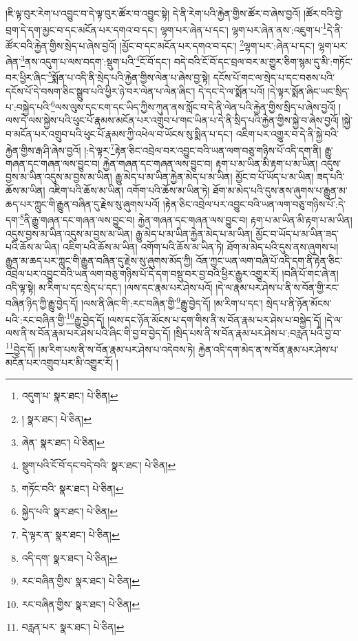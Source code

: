 །ཇི་ལྟ་བུར་རེག་པ་འབྱུང་བ་དེ་ལྟ་བུར་ཚོར་བ་འབྱུང་སྟེ། དེ་ནི་རེག་པའི་རྐྱེན་གྱིས་ཚོར་བ་ཞེས་བྱའོ། །ཚོར་བའི་བྱེ་བྲག་དེ་དག་མྱང་བ་དང་མངོན་པར་དགའ་བ་དང་། ལྷག་པར་ཞེན་པ་དང་། ལྷག་པར་ཞེན་ནས་:འཇུག་པ་\footnote{འདུག་པ་  སྣར་ཐང་།  པེ་ཅིན། }དེ་ནི་ཚོར་བའི་རྐྱེན་གྱིས་སྲེད་པ་ཞེས་བྱའོ། །མྱོང་བ་དང་མངོན་པར་དགའ་བ་དང་། \footnote{།    སྣར་ཐང་།  པེ་ཅིན། }ལྷག་པར་:ཞེན་པ་དང་། ལྷག་པར་ཞེན་\footnote{ཞེན་  སྣར་ཐང་།  པེ་ཅིན། }ནས་འདུག་པ་ལས་བདག་:སྡུག་པའི་\footnote{སྡུག་པའི་ངོ་བོ་དང་བདེ་བའི་  སྣར་ཐང་།  པེ་ཅིན། }ངོ་བོ་དང་། བདེ་བའི་ངོ་བོ་དང་བྲལ་བར་མ་གྱུར་ཅིག་སྙམ་དུ་མི་:གཏོང་བར་ཕྱིར་ཞིང་\footnote{གཏོང་བའི་  སྣར་ཐང་།  པེ་ཅིན། }སྨོན་པ་འདི་ནི་སྲེད་པའི་རྐྱེན་གྱིས་ལེན་པ་ཞེས་བྱ་སྟེ། དངོས་པོ་གང་ལ་སྲེད་པ་དང་བཅས་པའི་དངོས་པོ་དེ་བསག་ཅིང་སྒྲུབ་པའི་ཕྱིར་ཉེ་བར་ལེན་པ་ལེན་ཞིང་། དེ་དང་དེ་ལ་སྨོན་པའོ། །དེ་ལྟར་སྨོན་ཞིང་ཡང་སྲིད་པ་:བསྐྱེད་པའི་\footnote{སྐྱེད་པའི་  སྣར་ཐང་།  པེ་ཅིན། }ལས་ལུས་དང་ངག་དང་ཡིད་ཀྱིས་ཀུན་ནས་སློང་བ་དེ་ནི་ལེན་པའི་རྐྱེན་གྱིས་སྲིད་པ་ཞེས་བྱའོ། །ལས་དེ་ལས་སྐྱེས་པའི་ཕུང་པོ་རྣམས་མངོན་པར་འགྲུབ་པ་གང་ཡིན་པ་དེ་ནི་སྲིད་པའི་རྐྱེན་གྱིས་སྐྱེ་བ་ཞེས་བྱའོ། །སྐྱེ་བ་མངོན་པར་འགྲུབ་པའི་ཕུང་པོ་རྣམས་ཀྱི་འཕེལ་བ་ཡོངས་སུ་སྨིན་པ་དང་། འཇིག་པར་འགྱུར་བ་དེ་ནི་སྐྱེ་བའི་རྐྱེན་གྱིས་རྒ་ཤི་ཞེས་བྱའོ། །:དེ་ལྟར་\footnote{དེ་ལྟར་ན་  སྣར་ཐང་།  པེ་ཅིན། }རྟེན་ཅིང་འབྲེལ་བར་འབྱུང་བའི་ཡན་ལག་བཅུ་གཉིས་པོ་འདི་དག་ནི། རྒྱུ་གཞན་དང་གཞན་ལས་བྱུང་བ། རྐྱེན་གཞན་དང་གཞན་ལས་བྱུང་བ། རྟག་པ་མ་ཡིན་མི་རྟག་པ་མ་ཡིན། འདུས་བྱས་མ་ཡིན་འདུས་མ་བྱས་མ་ཡིན། རྒྱུ་མེད་པ་མ་ཡིན་རྐྱེན་མེད་པ་མ་ཡིན། མྱོང་བ་པོ་ཡོད་པ་མ་ཡིན། ཟད་པའི་ཆོས་མ་ཡིན། འཇིག་པའི་ཆོས་མ་ཡིན། འགོག་པའི་ཆོས་མ་ཡིན་ཏེ། ཐོག་མ་མེད་པའི་དུས་ནས་ཞུགས་པ་རྒྱུན་མ་ཆད་པར་ཀླུང་གི་རྒྱུན་བཞིན་དུ་རྗེས་སུ་ཞུགས་པའོ། །རྟེན་ཅིང་འབྲེལ་པར་འབྱུང་བའི་ཡན་ལག་བཅུ་གཉིས་པོ་:དེ་དག་\footnote{འདི་དག་  སྣར་ཐང་།  པེ་ཅིན། }ནི་རྒྱུ་གཞན་དང་གཞན་ལས་བྱུང་བ། རྐྱེན་གཞན་དང་གཞན་ལས་བྱུང་བ། རྟག་པ་མ་ཡིན་མི་རྟག་པ་མ་ཡིན། འདུས་བྱས་མ་ཡིན་འདུས་མ་བྱས་མ་ཡིན། རྒྱུ་མེད་པ་མ་ཡིན་རྐྱེན་མེད་པ་མ་ཡིན། མྱོང་བ་ཡོད་པ་མ་ཡིན་ཟད་པའི་ཆོས་མ་ཡིན། འཇིག་པའི་ཆོས་མ་ཡིན། འགོག་པའི་ཆོས་མ་ཡིན་ཏེ། ཐོག་མ་མེད་པའི་དུས་ནས་ཞུགས་པ། རྒྱུན་མ་ཆད་པར་ཀླུང་གི་རྒྱུན་བཞིན་དུ་རྗེས་སུ་ཞུགས་མོད་ཀྱི། འོན་ཀྱང་ཡན་ལག་བཞི་པོ་འདི་དག་ནི་རྟེན་ཅིང་འབྲེལ་པར་འབྱུང་བའི་ཡན་ལག་བཅུ་གཉིས་པོ་དེ་དག་བསྡུ་བར་བྱ་བའི་ཕྱིར་རྒྱུར་འགྱུར་རོ། །བཞི་པོ་གང་ཞེ་ན། འདི་ལྟ་སྟེ། མ་རིག་པ་དང་སྲེད་པ་དང་། །ལས་དང་རྣམ་པར་ཤེས་པའོ། །དེ་ལ་རྣམ་པར་ཤེས་པ་ནི་ས་བོན་གྱི་རང་བཞིན་ཉིད་ཀྱི་རྒྱུ་བྱེད་དོ། །ལས་ནི་ཞིང་གི་:རང་བཞིན་གྱི་\footnote{རང་བཞིན་གྱིས་  སྣར་ཐང་།  པེ་ཅིན། }རྒྱུ་བྱེད་དོ། །མ་རིག་པ་དང་། སྲེད་པ་ནི་ཉོན་མོངས་པའི་:རང་བཞིན་གྱི་\footnote{རང་བཞིན་གྱིས་  སྣར་ཐང་།  པེ་ཅིན། }རྒྱུ་བྱེད་དོ། །ལས་དང་ཉོན་མོངས་པ་དག་གིས་ནི་ས་བོན་རྣམ་པར་ཤེས་པ་བསྐྱེད་དོ། །དེ་ལ་ལས་ནི་ས་བོན་རྣམ་པར་ཤེས་པའི་ཞིང་གི་བྱ་བ་བྱེད་དོ། །སྲིད་པས་ནི་ས་བོན་རྣམ་པར་ཤེས་པ་:བརླན་པའི་བྱ་བ་\footnote{བརླན་པར་  སྣར་ཐང་།  པེ་ཅིན། }བྱེད་དོ། །མ་རིག་པས་ནི་ས་བོན་རྣམ་པར་ཤེས་པ་འདེབས་ཏེ། རྐྱེན་འདི་དག་མེད་ན་ས་བོན་རྣམ་པར་ཤེས་པ་མངོན་པར་འགྲུབ་པར་མི་འགྱུར་རོ། །
